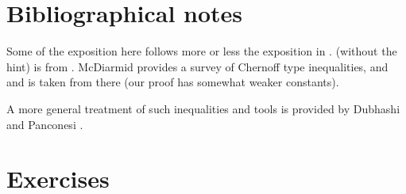 



\section{Bibliographical notes}

Some of the exposition here follows more or less the exposition in
\cite{mr-ra-95}.   (without the hint) is from
\cite{m-gd-99}. McDiarmid \cite{m-ombd-89} provides a survey of
Chernoff type inequalities, and  and
 is taken from there (our proof has
somewhat weaker constants).


A more general treatment of such inequalities and tools is provided by
Dubhashi and Panconesi \cite{dp-cmara-09}.


\section{Exercises}

